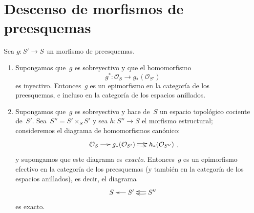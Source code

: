 \section{Descenso de morfismos de preesquemas}
\label{VIII.5}

\begin{proposition}
\label{VIII.5.1}
Sea $g\colon S'\to S$ un morfismo de preesquemas.
\begin{enumerate}
\item[a)] Supongamos que~$g$ es sobreyectivo y que el homomorfismo
$$
g^*\colon \mathcal{O}_{S}\to g_*(\mathcal{O}_{S'})
$$
es inyectivo. Entonces~$g$ es un epimorfismo en la categoría de los
preesquemas, e incluso en la categoría de los espacios anillados.
\item[b)] Supongamos que~$g$ es sobreyectivo y hace de~$S$ un espacio
topológico cociente de~$S'$. Sea~$S''=S'\times_{S}S'$ y sea
$h\colon S''\to S$ el morfismo estructural; consideremos el diagrama de
homomorfismos canónico:
$$
\xymatrix@C=.5cm{\mathcal{O}_{S} \ar[r] &
g_*(\mathcal{O}_{S'})\ar@/^2pt/[r]\ar@/_2pt/[r] &
h_*(\mathcal{O}_{S''})}\quoi,
$$
y supongamos que este diagrama es \emph{exacto}. Entonces~$g$ es un
epimorfismo efectivo
%
en la categoría de los preesquemas (y también en la categoría de los
espacios anillados), es decir, el diagrama
$$
\xymatrix@C=.5cm{S & S'\ar[l] & S''\ar@/^2pt/[l]\ar@/_2pt/[l]}
$$
es exacto.
\end{enumerate}
\end{proposition}

